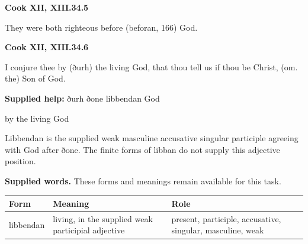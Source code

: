 \par\begin{minipage}{\linewidth}\raggedright
\textbf{Cook XII, XIII.34.5}

They were both righteous before (beforan, 166) God.

\end{minipage}\par\addvspace{4pt}

\par\begin{minipage}{\linewidth}\raggedright
\textbf{Cook XII, XIII.34.6}

I conjure thee by (ðurh) the living God, that thou tell us if thou be Christ, (om. the) Son of God.

\textbf{Supplied help:} ðurh ðone libbendan God

by the living God

Libbendan is the supplied weak masculine accusative singular participle agreeing with God after ðone. The finite forms of libban do not supply this adjective position.

\textbf{Supplied words.} These forms and meanings remain available for this task.

\par\begingroup
\fontsize{10.5}{13.2}\selectfont
\setlength{\LTleft}{0pt}\setlength{\LTright}{\fill}
\noindent
\begin{tabular}{@{}>{\raggedright\arraybackslash}p{16.74mm}>{\raggedright\arraybackslash}p{47.8mm}>{\raggedright\arraybackslash}p{53.83mm}@{}}
\toprule
\textbf{Form} & \textbf{Meaning} & \textbf{Role} \\
\midrule
libbendan & living, in the supplied weak participial adjective & present, participle, accusative, singular, masculine, weak \\
\bottomrule
\end{tabular}
\par\endgroup

\end{minipage}\par\addvspace{4pt}

